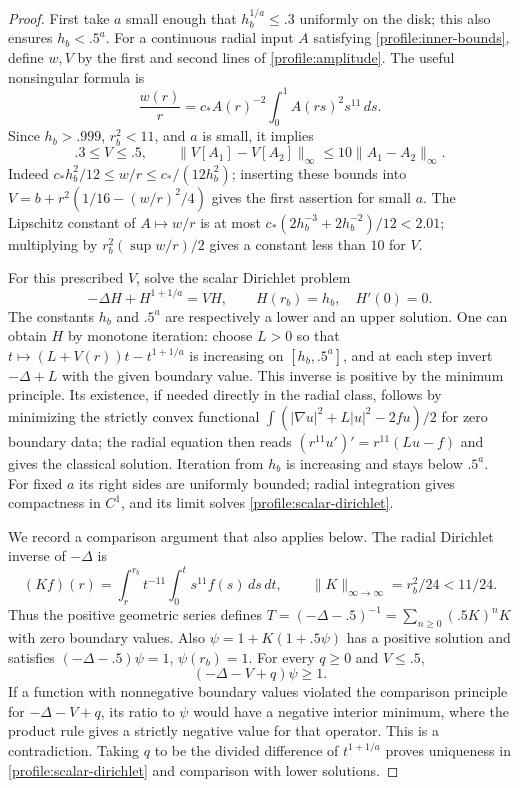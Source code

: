\documentclass[11pt]{article}
\numberwithin{equation}{section}
\theoremstyle{definition}
\theoremstyle{remark}
\begin{document}
\begin{proof}
First take $a$ small enough that $h_b^{1/a}\le.3$ uniformly on the disk;
this also ensures $h_b<.5^a$.  For a continuous radial input $A$ satisfying
\eqref{profile:inner-bounds}, define $w,V$ by the first and second lines
of \eqref{profile:amplitude}.  The useful nonsingular formula is
\begin{equation}\label{profile:w-ratio}
 \frac{w(r)}r=c_* A(r)^{-2}\int_0^1A(rs)^2s^{11}\,ds.
\end{equation}
Since $h_b>.999$, $r_b^2<11$, and $a$ is small, it implies
\begin{equation}\label{profile:V-bounds}
 .3\le V\le .5,\qquad
 \|V[A_1]-V[A_2]\|_\infty\le10\|A_1-A_2\|_\infty.
\end{equation}
Indeed $c_*h_b^2/12\le w/r\le c_*/(12h_b^2)$; inserting these bounds
into $V=b+r^2(1/16-(w/r)^2/4)$ gives the first assertion for small $a$.
The Lipschitz constant of $A\mapsto w/r$ is at most
$c_*(2h_b^{-3}+2h_b^{-2})/12<2.01$; multiplying by
$r_b^2(\sup w/r)/2$ gives a constant less than $10$ for $V$.

For this prescribed $V$, solve the scalar Dirichlet problem
\begin{equation}\label{profile:scalar-dirichlet}
 -\Delta H+H^{1+1/a}=VH,\qquad H(r_b)=h_b,\quad H'(0)=0.
\end{equation}
The constants $h_b$ and $.5^a$ are respectively a lower and an upper
solution.  One can obtain $H$ by monotone iteration: choose $L>0$ so that
$t\mapsto(L+V(r))t-t^{1+1/a}$ is increasing on $[h_b,.5^a]$, and at
each step invert $-\Delta+L$ with the given boundary value.  This inverse
is positive by the minimum principle.  Its existence, if needed directly
in the radial class, follows by minimizing the strictly convex functional
$\int(|\nabla u|^2+L|u|^2-2fu)/2$ for zero boundary data; the radial
equation then reads $(r^{11}u')'=r^{11}(Lu-f)$ and gives the classical
solution.  Iteration from $h_b$ is increasing and stays below $.5^a$.
For fixed $a$ its right sides are uniformly bounded; radial integration
gives compactness in $C^1$, and its limit solves
\eqref{profile:scalar-dirichlet}.

We record a comparison argument that also applies below.  The radial
Dirichlet inverse of $-\Delta$ is
\[
 (Kf)(r)=\int_r^{r_b}t^{-11}\int_0^t s^{11}f(s)\,ds\,dt,
       \qquad \|K\|_{\infty\to\infty}=r_b^2/24<11/24.
\]
Thus the positive geometric series defines
$T=(-\Delta-.5)^{-1}=\sum_{n\ge0}(.5K)^nK$ with zero boundary values.
Also $\psi=1+K(1+.5\psi)$ has a positive solution and satisfies
$(-\Delta-.5)\psi=1$, $\psi(r_b)=1$.  For every $q\ge0$ and $V\le.5$,
\[
 (-\Delta-V+q)\psi\ge1.
\]
If a function with nonnegative boundary values violated the comparison
principle for $-\Delta-V+q$, its ratio to $\psi$ would have a negative
interior minimum, where the product rule gives a strictly negative value
for that operator.  This is a contradiction.  Taking $q$ to be the
divided difference of $t^{1+1/a}$ proves uniqueness in
\eqref{profile:scalar-dirichlet} and comparison with lower solutions.


\end{proof}
\end{document}
